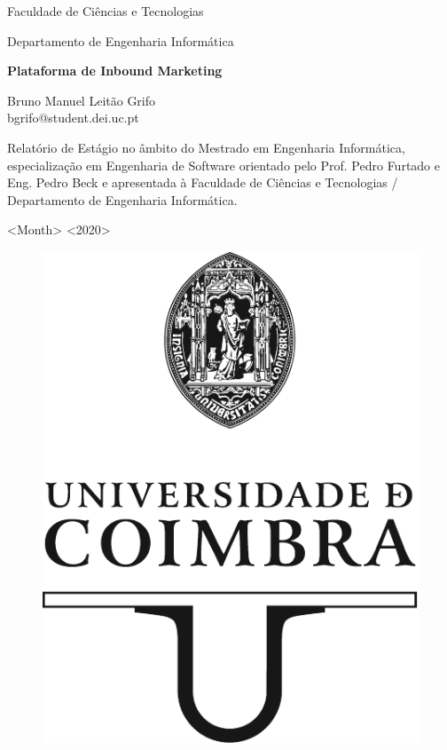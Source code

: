 

\begin{titlepage}
 

\begin{center}
\Large
Faculdade de Ciências e Tecnologias

Departamento de Engenharia Informática
\vspace{1cm}

\Huge
\textbf{\textup{\textsf{Plataforma de Inbound Marketing}}}

\LARGE

\textsf{}

\vspace{3cm}

\Large
Bruno Manuel Leitão Grifo \\
bgrifo@student.dei.uc.pt

\vspace{3cm}

\normalsize

Relatório de Estágio no âmbito do Mestrado em Engenharia Informática, especialização em Engenharia de Software orientado pelo Prof. Pedro Furtado e Eng. Pedro Beck e apresentada à Faculdade de Ciências e Tecnologias / Departamento de Engenharia Informática.


\vspace{0.5cm}

<Month> <2020>

\begin{figure}[b]
	\begin{center}
	\includegraphics[width=0.3\linewidth]{images/_UC_logo.pdf}
	\label{fig:Logo}	
	\end{center}
\end{figure}


\end{center}


\end{titlepage}
\restoregeometry
